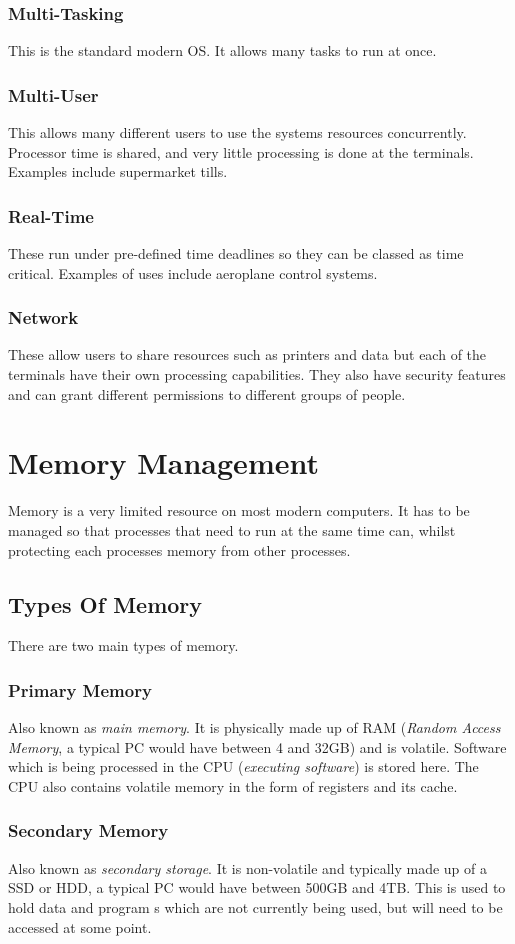 \documentclass[a4paper,11pt, twocolumn]{article}
\begin{document}
\subsubsection{Multi-Tasking}
This is the standard modern OS. It allows many tasks to run at once.
\subsubsection{Multi-User}
This allows many different users to use the systems resources concurrently. Processor time is shared, and very little processing is done at the terminals. Examples include supermarket tills.
\subsubsection{Real-Time}
These run under pre-defined time deadlines so they can be classed as time critical. Examples of uses include aeroplane control systems.
\subsubsection{Network}
These allow users to share resources such as printers and data but each of the terminals have their own processing capabilities. They also have security features and can grant different permissions to different groups of people. 

\section{Memory Management}
Memory is a very limited resource on most modern computers. It has to be managed so that processes that need to run at the same time can, whilst protecting each processes memory from other processes. 
\subsection{Types Of Memory}
There are two main types of memory.
\subsubsection{Primary Memory}
Also known as \textit{main memory}. It is physically made up of RAM (\textit{Random Access Memory}, a typical PC would have between 4 and 32GB) and is volatile. Software which is being processed in the CPU (\textit{executing software}) is stored here. The CPU also contains volatile memory in the form of registers and its cache.
\subsubsection{Secondary Memory}
Also known as \textit{secondary storage}. It is non-volatile and typically made up of a SSD or HDD, a typical PC would have between 500GB and 4TB. This is used to hold data and program s which are not currently being used, but will need to be accessed at some point. 
\end{document}

